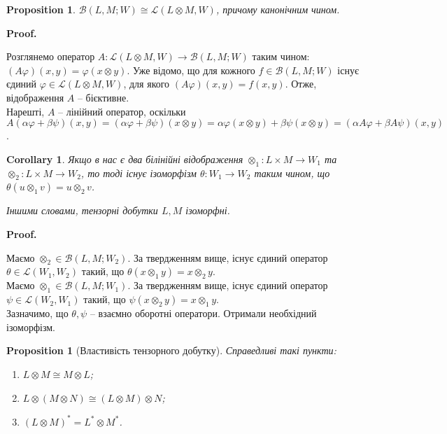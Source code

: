 \documentclass[a4paper, 10pt]{article}
\makeatletter
\theoremstyle{theoremdd}
\newtheorem{proposition}[theorem]{Proposition}
\newtheorem{corollary}[theorem]{Corollary}
\renewenvironment{proof}[1][Proof.\\]{\par
\pushQED{\hfill \qed}%
\normalfont \topsep6\p@\@plus6\p@\relax
\trivlist
\item\relax
{\bfseries
#1\@addpunct{.}}\hspace\labelsep\ignorespaces
}{%
\popQED\endtrivlist\@endpefalse
}
\makeatother
\begin{document}
\begin{proposition}
$\mathcal{B}(L,M; W) \cong \mathcal{L}(L \otimes M, W)$, причому канонічним чином.
\end{proposition}

\begin{proof}
Розглянемо оператор $A \colon \mathcal{L}(L \otimes M, W) \to \mathcal{B}(L,M;W)$ таким чином: $(A\varphi)(x,y) = \varphi(x \otimes y)$. Уже відомо, що для кожного $f \in \mathcal{B}(L,M;W)$ існує єдиний $\varphi \in \mathcal{L}(L \otimes M,W)$, для якого $(A \varphi)(x,y) = f(x,y)$. Отже, відображення $A$ -- бієктивне.\\
Нарешті, $A$ -- лінійний оператор, оскільки $A(\alpha \varphi + \beta \psi)(x,y) = (\alpha \varphi + \beta \psi)(x \otimes y) = \alpha \varphi(x \otimes y) + \beta \psi(x \otimes y) = (\alpha A\varphi + \beta A \psi)(x,y)$.
\end{proof}

\begin{corollary}
Якщо в нас є два білінійні відображення $\otimes_1 \colon L \times M \to W_1$ та $\otimes_2 \colon L \times M \to W_2$, то тоді існує ізоморфізм $\theta \colon W_1 \to W_2$ таким чином, що $\theta(u \otimes_1 v) = u \otimes_2 v$.
\begin{figure}[H]
\centering
{}
\end{figure}
\noindent
Іншими словами, тензорні добутки $L,M$ ізоморфні.
\end{corollary}

\begin{proof}
Маємо $\otimes_2 \in \mathcal{B}(L,M;W_2)$. За твердженням вище, існує єдиний оператор $\theta \in \mathcal{L}(W_1,W_2)$ такий, що $\theta(x \otimes_1 y) = x \otimes_2 y$.\\
Маємо $\otimes_1 \in \mathcal{B}(L,M;W_1)$. За твердженням вище, існує єдиний оператор $\psi \in \mathcal{L}(W_2,W_1)$ такий, що $\psi(x \otimes_2 y) = x \otimes_1 y$.\\
Зазначимо, що $\theta, \psi$ -- взаємно оборотні оператори. Отримали необхідний ізоморфізм.
\end{proof}

\begin{proposition}[Властивість тензорного добутку]
Справедливі такі пункти:
\begin{enumerate}[nosep,wide=0pt,label={\arabic*)}]
\item $L \otimes M \cong M \otimes L$;
\item $L \otimes (M \otimes N) \cong (L \otimes M) \otimes N$;
\item $(L \otimes M)^* = L^* \otimes M^*$.
\end{enumerate}
\end{proposition}
\end{document}

